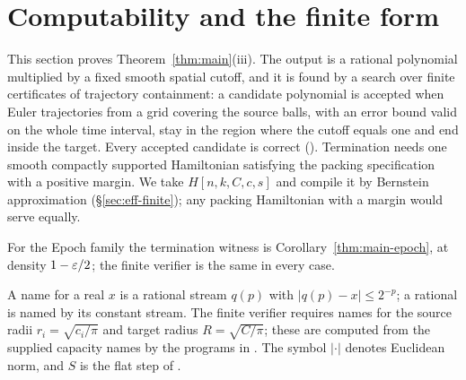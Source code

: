 \section{Computability and the finite form}\label{sec:eff}

This section proves Theorem~\ref{thm:main}(iii). The output is a rational polynomial multiplied by a fixed
smooth spatial cutoff, and it is found by a search over finite certificates of trajectory containment: a
candidate polynomial is accepted when Euler trajectories from a grid covering the source balls, with an error
bound valid on the whole time interval, stay in the region where the cutoff equals one and end inside the target. Every
accepted candidate is correct (). Termination needs one smooth compactly
supported Hamiltonian satisfying the packing specification with a positive margin. We take
$H[n,k,C,c,s]$ and compile it by Bernstein approximation (\S\ref{sec:eff-finite}); any packing Hamiltonian with
a margin would serve equally.

For the Epoch family the termination witness is Corollary~\ref{thm:main-epoch}, at density $1-\varepsilon/2$; the
finite verifier is the same in every case.

A name for a real $x$ is a rational stream $q(p)$ with $|q(p)-x|\le2^{-p}$; a rational is named by its constant
stream. The finite verifier requires names for the source radii $r_i=\sqrt{c_i/\pi}$ and
target radius $R=\sqrt{C/\pi}$; these are computed from the supplied capacity
names by the programs in .
The symbol $|\cdot|$ denotes Euclidean norm, and $S$ is the flat step of
.

